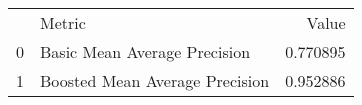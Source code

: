 \begin{tabular}{llr}
 & Metric & Value \\
0 & Basic Mean Average Precision & 0.770895 \\
1 & Boosted Mean Average Precision & 0.952886 \\
\end{tabular}
